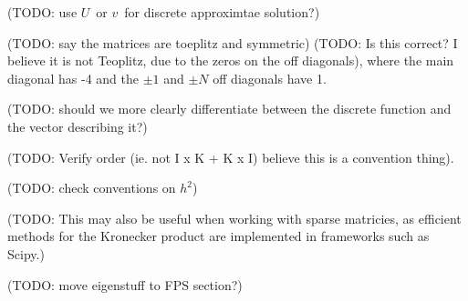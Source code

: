 (TODO: use $U$ or $v$ for discrete approximtae solution?)

(TODO: say the matrices are toeplitz and symmetric) (TODO: Is this correct? I believe it is not Teoplitz, due to the zeros on the off diagonals), where the main diagonal has -4 and the $\pm 1$ and $\pm N$ off diagonals have 1.

(TODO: should we more clearly differentiate between the discrete function and the vector describing it?)

(TODO: Verify order (ie. not I x K + K x I) believe this is a convention thing).

(TODO: check conventions on $h^2$)

(TODO: This may also be useful when working with sparse matricies, as efficient methods for the Kronecker product are implemented in frameworks such as Scipy\cite{scipy_kron}.)

(TODO: move eigenstuff to FPS section?)

